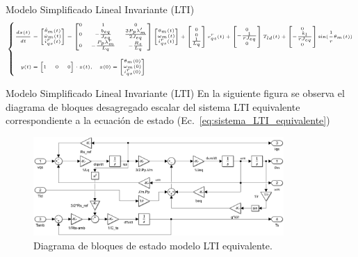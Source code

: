 \documentclass[12pt]{beamer}
\begin{document}
\begin{frame}{Modelo Simplificado Lineal Invariante (LTI)}
\[
\tiny
\left\{
\begin{aligned}
\frac{dx(t)}{dt} &= \begin{bmatrix} \dot{\theta}_m(t) \\ \dot{\omega}_m(t) \\ \dot{i}^r_{qs}(t) \end{bmatrix} = 
\begin{bmatrix} 
0 & 1 & 0 \\
0 & -\frac{b_{eq}}{J_{eq}} & \frac{3P_p\lambda'_m}{2J_{eq}} \\
0 & -\frac{P_p\lambda^r_m}{L_q} & -\frac{R_s}{L_q}
\end{bmatrix}
\begin{bmatrix} \theta_m(t) \\ \omega_m(t) \\ i^r_{qs}(t) \end{bmatrix} +
\begin{bmatrix} 0 \\ 0 \\ \frac{1}{L_q} \end{bmatrix}v^r_{qs}(t) +
\begin{bmatrix} 0 \\ -\frac{1}{rJ_{eq}} \\ 0 \end{bmatrix}T_{ld}(t) +
\begin{bmatrix} 0 \\ -\frac{k_l}{rJ_{eq}} \\ 0 \end{bmatrix}\sin(\frac{1}{r}\theta_m(t)) \\[2ex]
y(t) &= \begin{bmatrix} 1 & 0 & 0 \end{bmatrix}\cdot x(t), \quad
x(0) = \begin{bmatrix} \theta_m(0) \\ \omega_m(0) \\ i^r_{qs}(0) \end{bmatrix}
\end{aligned}
\right.
\]
\end{frame}

\begin{frame}{Modelo Simplificado Lineal Invariante (LTI)}
    En la siguiente figura se observa el diagrama de bloques desagregado escalar del sistema LTI equivalente correspondiente a la ecuación de estado (Ec.~\ref{eq:sistema_LTI_equivalente})
    \begin{figure}[h]
    \centering
    \includegraphics[width=0.85\textwidth]{Imagenes/SistEqLTI.png}
    \caption{Diagrama de bloques de estado modelo LTI equivalente.}
    \end{figure}
\end{frame}
\end{document}
